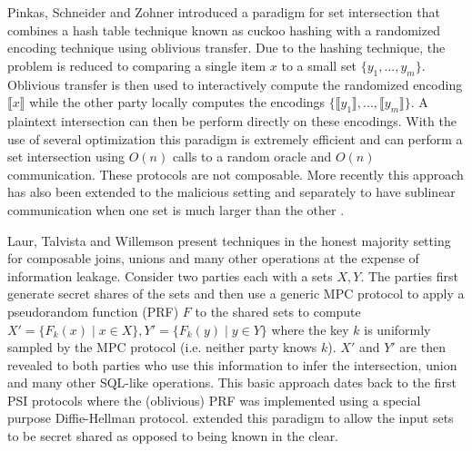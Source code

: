 Pinkas, Schneider and Zohner \cite{usenix:PSZ14} introduced a paradigm for set intersection that combines a hash table technique known as cuckoo hashing with a randomized encoding technique using oblivious transfer. Due to the hashing technique, the problem is reduced to comparing a single item $x$ to a small set $\{y_1,...,y_m\}$. Oblivious transfer is then used to interactively compute the randomized encoding $\llbracket x\rrbracket$ while the other party locally computes the encodings $\{\llbracket y_1\rrbracket,...,\llbracket y_m\rrbracket \}$. A plaintext intersection can then be perform directly on these encodings. With the use of several optimization\cite{USENIX:PSSZ15,PSZ16,CCS:KKRT16,OOS17} this paradigm is extremely efficient and can perform a set intersection using $O(n)$ calls to a random oracle and $O(n)$ communication. These protocols are not composable.
\iffullversion
More recently this approach has also been extended to the malicious setting \cite{CCS:RinRos17} and separately to have sublinear communication when one set is much larger than the other\cite{CLR17} .
\fi


Laur, Talvista and Willemson\cite{LTW13} present techniques in the honest majority setting for composable joins, unions and  many other operations at the expense of information leakage. Consider two parties each with a sets $X,Y$. The parties first generate secret shares of the sets and then use a generic MPC protocol to apply a pseudorandom function (PRF) $F$ to the shared sets to compute $X' = \{F_k(x) \mid x\in X\}, Y'=\{F_k(y) \mid y\in Y\}$ where the key $k$ is uniformly sampled by the MPC protocol (i.e. neither party knows $k$). $X'$ and $Y'$ are then revealed to both parties who use this information to infer the intersection, union and many other SQL-like operations. This basic approach dates back to the first PSI protocols \cite{Mea86,HFH99} where the (oblivious) PRF was implemented using a special purpose Diffie-Hellman protocol. \cite{LTW13} extended this paradigm to allow the input sets to be secret shared as opposed to being known in the clear.


